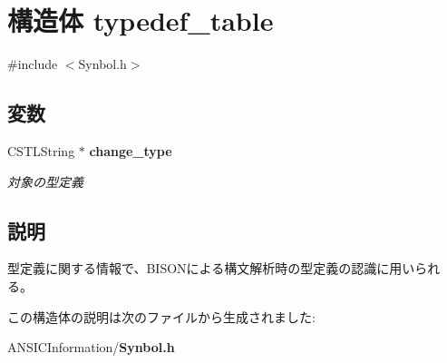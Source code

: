 \section{構造体 typedef\_\-table}
\label{structtypedef__table}


{\ttfamily \#include $<$Synbol.h$>$}

\subsection*{変数}
\begin{DoxyCompactItemize}
\item 
CSTLString $\ast$ {\bf change\_\-type}\label{structtypedef__table_a4afc97b97fbd4fc47fdc746bfce061f2}

\begin{DoxyCompactList}\small\item\em 対象の型定義 \item\end{DoxyCompactList}\end{DoxyCompactItemize}


\subsection{説明}
型定義に関する情報で、BISONによる構文解析時の型定義の認識に用いられる。 

この構造体の説明は次のファイルから生成されました:\begin{DoxyCompactItemize}
\item 
ANSICInformation/{\bf Synbol.h}\end{DoxyCompactItemize}
